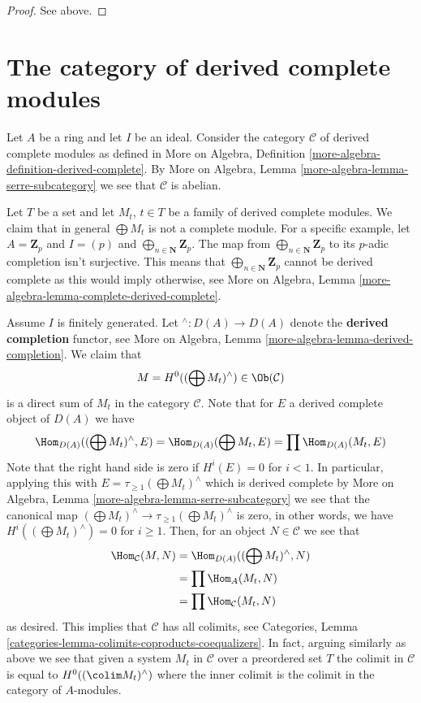 \begin{proof}
See above.
\end{proof}





\section{The category of derived complete modules}
\label{section-derived-complete-modules}

\noindent
Let $A$ be a ring and let $I$ be an ideal. Consider the category
$\mathcal{C}$ of derived complete modules as defined in
More on Algebra, Definition \ref{more-algebra-definition-derived-complete}.
By More on Algebra, Lemma \ref{more-algebra-lemma-serre-subcategory}
we see that $\mathcal{C}$ is abelian.

\medskip\noindent
Let $T$ be a set and let $M_t$, $t \in T$ be a family of derived complete
modules. We claim that in general $\bigoplus M_t$ is not a complete module.
For a specific example, let $A = \mathbf{Z}_p$ and $I = (p)$ and
$\bigoplus_{n \in \mathbf{N}} \mathbf{Z}_p$. The map from
$\bigoplus_{n \in \mathbf{N}} \mathbf{Z}_p$ to its $p$-adic completion
isn't surjective. This means that $\bigoplus_{n \in \mathbf{N}} \mathbf{Z}_p$
cannot be derived complete as this would imply otherwise, see
More on Algebra, Lemma \ref{more-algebra-lemma-complete-derived-complete}.

\medskip\noindent
Assume $I$ is finitely generated. Let ${}^\wedge : D(A) \to D(A)$ denote
the {\bf derived completion} functor, see
More on Algebra, Lemma \ref{more-algebra-lemma-derived-completion}.
We claim that
$$
M = H^0((\bigoplus M_t)^\wedge) \in \Ob(\mathcal{C})
$$
is a direct sum of $M_t$ in the category $\mathcal{C}$. Note that
for $E$ a derived complete object of $D(A)$ we have
$$
\Hom_{D(A)}((\bigoplus M_t)^\wedge, E) =
\Hom_{D(A)}(\bigoplus M_t, E) =
\prod \Hom_{D(A)}(M_t, E)
$$
Note that the right hand side is zero if $H^i(E) = 0$ for $i < 1$.
In particular, applying this with $E = \tau_{\geq 1} (\bigoplus M_t)^\wedge$
which is derived complete by
More on Algebra, Lemma \ref{more-algebra-lemma-serre-subcategory}
we see that the canonical map
$(\bigoplus M_t)^\wedge \to \tau_{\geq 1}(\bigoplus M_t)^\wedge$
is zero, in other words, we have
$H^i((\bigoplus M_t)^\wedge) = 0$ for $i \geq 1$. Then, for
an object $N \in \mathcal{C}$ we see that
\begin{align*}
\Hom_\mathcal{C}(M, N)
& =
\Hom_{D(A)}((\bigoplus M_t)^\wedge, N)\\
& =
\prod \Hom_A(M_t, N) \\
& =
\prod \Hom_\mathcal{C}(M_t, N)
\end{align*}
as desired. This implies that $\mathcal{C}$ has all colimits, see
Categories, Lemma \ref{categories-lemma-colimits-coproducts-coequalizers}.
In fact, arguing similarly as above we see that given a system $M_t$
in $\mathcal{C}$ over a preordered set $T$ the colimit
in $\mathcal{C}$ is equal to $H^0((\colim M_t)^\wedge)$ where the inner
colimit is the colimit in the category of $A$-modules.

